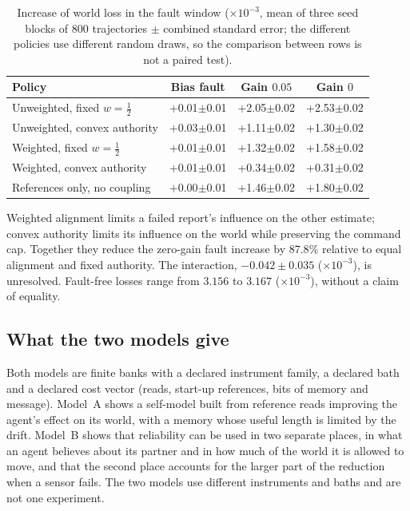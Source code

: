 \documentclass[12pt]{article}
\theoremstyle{definition}
\begin{document}
\begin{table}[htbp]
\centering
\begin{tabular}{lccc}
\hline
Policy & Bias fault & Gain $0.05$ & Gain $0$ \\
\hline
Unweighted, fixed $w=\tfrac12$ & +0.01$\pm$0.01 & +2.05$\pm$0.02 & +2.53$\pm$0.02 \\
Unweighted, convex authority & +0.03$\pm$0.01 & +1.11$\pm$0.02 & +1.30$\pm$0.02 \\
Weighted, fixed $w=\tfrac12$ & +0.01$\pm$0.01 & +1.32$\pm$0.02 & +1.58$\pm$0.02 \\
Weighted, convex authority & +0.01$\pm$0.01 & +0.34$\pm$0.02 & +0.31$\pm$0.02 \\
References only, no coupling & +0.00$\pm$0.01 & +1.46$\pm$0.02 & +1.80$\pm$0.02 \\
\hline
\end{tabular}
\caption{Increase of world loss in the fault window ($\times10^{-3}$, mean of three seed blocks of 800 trajectories $\pm$ combined standard error; the different policies use different random draws, so the comparison between rows is not a paired test).}
\label{tab:cells}
\end{table}

Weighted alignment limits a failed report's influence on the other estimate; convex authority limits its influence on the world while preserving the command cap. Together they reduce the zero-gain fault increase by $87.8\%$ relative to equal alignment and fixed authority. The interaction, $-0.042\pm0.035$ ($\times10^{-3}$), is unresolved. Fault-free losses range from $3.156$ to $3.167$ ($\times10^{-3}$), without a claim of equality.

\subsection{What the two models give}\label{subsec:loop_scope}

Both models are finite banks with a declared instrument family, a declared bath and a declared cost vector (reads, start-up references, bits of memory and message). Model~A shows a self-model built from reference reads improving the agent's effect on its world, with a memory whose useful length is limited by the drift. Model~B shows that reliability can be used in two separate places, in what an agent believes about its partner and in how much of the world it is allowed to move, and that the second place accounts for the larger part of the reduction when a sensor fails. The two models use different instruments and baths and are not one experiment.
\end{document}
